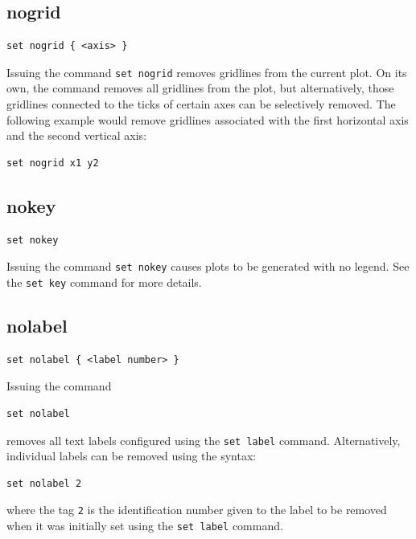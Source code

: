 \subsection{nogrid}

\begin{verbatim}
set nogrid { <axis> }
\end{verbatim}

Issuing the command {\tt set nogrid} removes gridlines from the current plot. On
its own, the command removes all gridlines from the plot, but alternatively,
those gridlines connected to the ticks of certain axes can be selectively
removed.  The following example would remove gridlines associated with the
first horizontal axis and the second vertical axis:

\begin{verbatim}
set nogrid x1 y2
\end{verbatim}


\subsection{nokey}

\begin{verbatim}
set nokey
\end{verbatim}

Issuing the command {\tt set nokey} causes plots to be generated with no legend.
See the {\tt set key} command for more details.


\subsection{nolabel}

\begin{verbatim}
set nolabel { <label number> }
\end{verbatim}

Issuing the command

\begin{verbatim}
set nolabel
\end{verbatim}

\noindent removes all text labels configured using the {\tt set label} command.
Alternatively, individual labels can be removed using the syntax:

\begin{verbatim}
set nolabel 2
\end{verbatim}

\noindent where the tag {\tt 2} is the identification number given to the label
to be removed when it was initially set using the {\tt set label} command.


